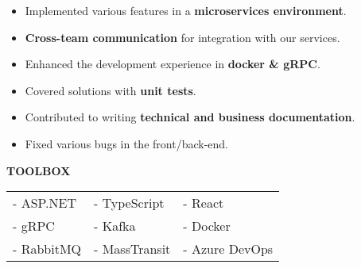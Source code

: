 \documentclass[10pt,a4paper,ragged2e]{altacv}
\begin{document}

\personalinfo{%
	
}

\begin{fullwidth}
	\makecvheader
\end{fullwidth}




\begin{itemize}
	\item Implemented various features in a \textbf{microservices environment}.
	\item \textbf{Cross-team communication} for integration with our services.
	\item Enhanced the development experience in \textbf{docker \& gRPC}.
	\item Covered solutions with \textbf{unit tests}.
	\item Contributed to writing \textbf{technical and business documentation}.
	\item Fixed various bugs in the front/back-end.
\end{itemize}

\smallskip
\textcolor{VividPurple}{\textbf{TOOLBOX}}
\medskip

\begin{tabular}{ l l l }
	- ASP.NET  & - TypeScript  & - React        \\
	- gRPC     & - Kafka       & - Docker       \\
	- RabbitMQ & - MassTransit & - Azure DevOps \\
\end{tabular}
\end{document}
